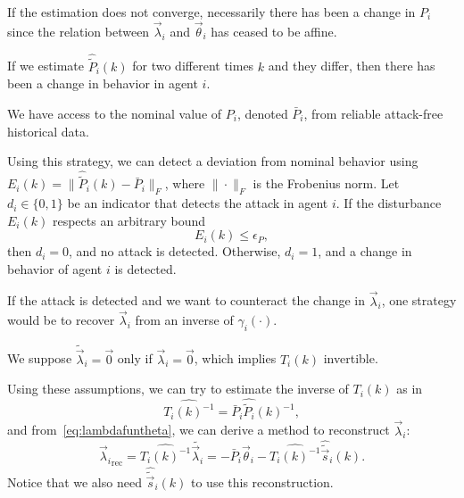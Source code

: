 \documentclass[a4paper, 10 pt, conference]{ieeeconf}  %
\begin{document}
\begin{remark}
If the estimation does not converge, necessarily there has been a change in $P_{i}$ since the relation between $\vec{\lambda}_{i}$ and $\vec{\theta}_{i}$ has ceased to be affine.

\end{remark}

If we estimate $\widehat{\tilde{P}}_{i}(k)$ for two different times $k$ and they differ, then there has been a change in behavior in agent $i$.


\begin{assumption}\label{ass:Pnominal}
  We have access to the nominal value of $P_{i}$, denoted $\bar{P}_{i}$, from reliable attack-free historical data.
\end{assumption}

Using this strategy, we can detect a deviation from nominal behavior using ${E_{i}(k) =\|\widehat{\tilde{P}}_{i}(k)-\bar{P}_{i}\|_{F}}$, where ${\|\cdot\|_{F}}$ is the Frobenius norm.
Let ${d_{i}\in\{0,1\}}$ be an indicator that detects the attack in agent $i$.
If the disturbance $E_{i}(k)$ respects an arbitrary bound
\begin{equation}
  \label{eq:2}
  E_{i}(k)\leq\epsilon_{P},
\end{equation}
then  ${d_{i}=0}$, and no attack is detected. Otherwise, ${d_{i}=1}$, and a change in behavior of agent $i$ is detected.

If the attack is detected and we want to counteract the change in $\vec{\lambda}_{i}$, one strategy would be to recover $\vec{\lambda}_{i}$ from an inverse of $\gamma_{i}(\cdot)$.


\begin{assumption}
We suppose ${\tilde{\vec{\lambda}}_{i}=\vec{0}}$ only if ${\vec{\lambda}_{i}=\vec{0}}$, which implies $T_{i}(k)$ invertible.
\end{assumption}

Using these assumptions, we can try to estimate the inverse of $T_{i}(k)$ as in  \begin{equation}\label{eq:5}
{\widehat{T_{i}(k)^{-1}}=\bar{P}_{i}\widehat{\tilde{P}_{i}}(k)^{-1}},
\end{equation}
and from~\eqref{eq:lambdafuntheta}, we can derive a method to reconstruct $\vec{\lambda}_{i}$:
\begin{equation}
  \label{eq:lambdareconstruction}
  {\vec{\lambda}_{i}}_{\mathrm{rec}}=\widehat{T_{i}(k)^{-1}} \tilde{\vec{\lambda}_{i}} =-\bar{P}_{i}\vec{\theta}_{i}-\widehat{{T_{i}(k)^{-1}}}\widehat{\tilde{\vec{s}}}_{i}(k).
\end{equation}
Notice that we also need $\widehat{\tilde{\vec{s}}}_{i}(k)$ to use this reconstruction.
\end{document}
